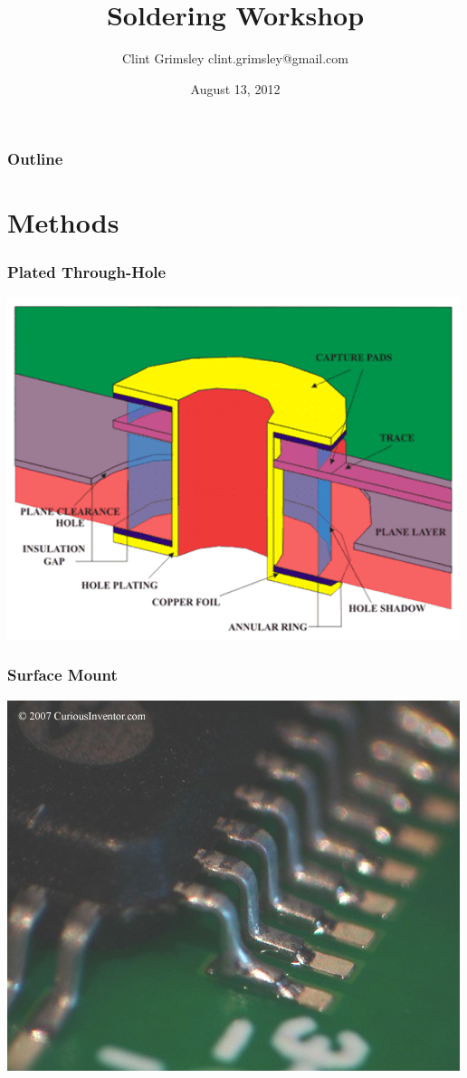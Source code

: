 \documentclass{beamer}
\title{Soldering Workshop}
\author{Clint Grimsley clint.grimsley@gmail.com}
\institute{HackRVA}
\date{August 13, 2012}
\begin{document}
\begin{frame}
\titlepage
\end{frame}

\begin{frame}
  \frametitle{Outline}
    \tableofcontents
\end{frame}

\section{Methods}
\begin{frame}
\frametitle{Plated Through-Hole}
\includegraphics[scale=0.45]{images/pth.png}
\end{frame}

\begin{frame}
\frametitle{Surface Mount}
\includegraphics[scale=0.50]{images/surface_mount.jpg}
\end{frame}
\end{document}
